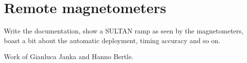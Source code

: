 \chapter{Remote magnetometers}
\label{ch:remote_magnetometers_appendix}

Write the documentation, show a SULTAN ramp as seen by the magnetometers, boast a bit about the automatic deployment, timing accuracy and so on.

Work of Gianluca Janka and Hanno Bertle.